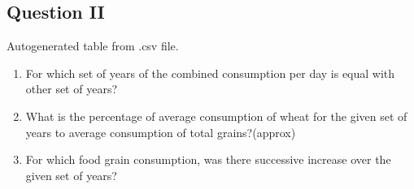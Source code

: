 \documentclass[a4paper]{article}
\begin{document}
\subsection*{Question II}
\begin{table}[h]
  \begin{center}
    \caption{Autogenerated table from .csv file.}
    \label{table1}
  \end{center}
\end{table}
\begin{enumerate}
\item For which set of years of the combined consumption per day is equal with other set of years?
\item What is the percentage of average consumption of wheat for the given set of years to average consumption of total grains?(approx)
\item For which food grain consumption, was there successive increase over the given set of years?
\end{enumerate}
\pagebreak
\end{document}
